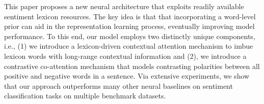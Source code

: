 This paper proposes a new neural architecture that exploits readily available sentiment lexicon resources. The key idea is that that incorporating a word-level prior can aid in the representation learning process, eventually improving model performance. To this end, our model employs two distinctly unique components, i.e., (1) we introduce a lexicon-driven contextual attention mechanism to imbue lexicon words with long-range contextual information and (2), we introduce a contrastive co-attention mechanism that models contrasting polarities between all positive and negative words in a sentence. Via extensive experiments, we show that our approach outperforms many other neural baselines on sentiment classification tasks on multiple benchmark datasets.
